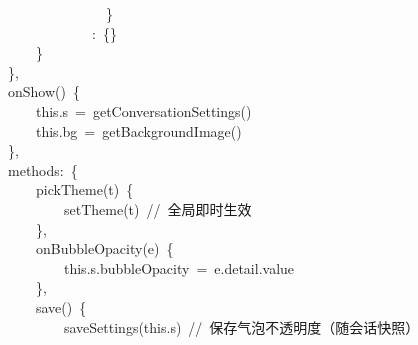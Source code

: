 \documentclass[a4paper,10pt]{article}
\begin{document}
{~~~~~~~~~~~~~~~~~~~~~~\}\\
~~~~~~~~~~~~~~~~~~~~:~\{\}\\
~~~~~~~~~~~~\}\\
~~~~~~~~\},\\
~~~~~~~~onShow()~\{\\
~~~~~~~~~~~~this.s~=~getConversationSettings()\\
~~~~~~~~~~~~this.bg~=~getBackgroundImage()\\
~~~~~~~~\},\\
~~~~~~~~methods:~\{\\
~~~~~~~~~~~~pickTheme(t)~\{\\
~~~~~~~~~~~~~~~~setTheme(t)~//~全局即时生效\\
~~~~~~~~~~~~\},\\
~~~~~~~~~~~~onBubbleOpacity(e)~\{\\
~~~~~~~~~~~~~~~~this.s.bubbleOpacity~=~e.detail.value\\
~~~~~~~~~~~~\},\\
~~~~~~~~~~~~save()~\{\\
~~~~~~~~~~~~~~~~saveSettings(this.s)~//~保存气泡不透明度（随会话快照）
}

\newpage
\end{document}
